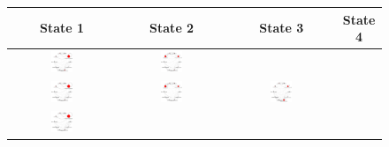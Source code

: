 \begin{figure}
  \centering
  \begin{tabular}{cccc}
    \textbf{State 1} & \textbf{State 2} & \textbf{State 3} & \textbf{State
    4}\\\hline
    \includegraphics[width=0.22\textwidth]{figures/text-2state/state0.png}
    &
    \includegraphics[width=0.22\textwidth]{figures/text-2state/state1.png}\\
    \includegraphics[width=0.22\textwidth]{figures/text-3state/state0.png}
    &
    \includegraphics[width=0.22\textwidth]{figures/text-3state/state1.png}
    &
    \includegraphics[width=0.22\textwidth]{figures/text-3state/state2.png}\\
    \includegraphics[width=0.22\textwidth]{figures/text-4state/state0.png}

\end{tabular}
\end{figure}
